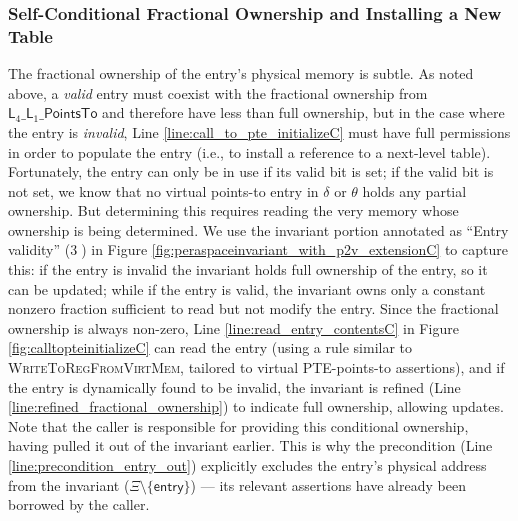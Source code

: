 \subsubsection{Self-Conditional Fractional Ownership and Installing a New Table}
\label{sec:selfconditional}
The fractional ownership of the entry's physical memory is subtle.
As noted above, a \emph{valid} entry must coexist with the fractional ownership from
$\textsf{L}_{4}\_\textsf{L}_{1}\_\textsf{PointsTo}$ and therefore have less than full ownership,
but in the case where the entry is \emph{invalid}, Line \ref{line:call_to_pte_initializeC} must have full permissions in order
to populate the entry (i.e., to install a reference to a next-level table).
Fortunately, the entry can only be in use if its valid bit is set; if the valid bit is not set, we know
that no virtual points-to entry in $\delta$ or $\theta$ holds any partial ownership.
But determining this requires reading the very memory whose ownership is being determined.
We use the invariant portion annotated as ``Entry validity'' (\textcircled{3}) in Figure \ref{fig:peraspaceinvariant_with_p2v_extensionC} to capture this:
if the entry is invalid the invariant holds full ownership of the entry, so it can be updated;
while if the entry is valid, the invariant owns only a constant nonzero fraction sufficient to read but not modify the entry.
Since the fractional ownership is always non-zero, Line \ref{line:read_entry_contentsC} in Figure \ref{fig:calltopteinitializeC} can read the entry
(using a rule similar to \textsc{WriteToRegFromVirtMem}, tailored to virtual PTE-points-to assertions),
and if the entry is dynamically found to be invalid, the invariant is refined (Line \ref{line:refined_fractional_ownership})
to indicate full ownership, allowing updates.
Note that the caller is responsible for providing this conditional ownership, having pulled it out of the invariant earlier.
This is why the precondition (Line \ref{line:precondition_entry_out}) explicitly excludes the entry's physical address from the invariant ($\Xi\setminus\{\mathsf{entry}\}$) ---
its relevant assertions have already been borrowed by the caller.

